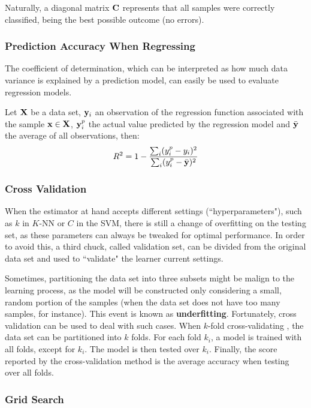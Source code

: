 Naturally, a diagonal matrix $\mathbf{C}$ represents that all samples were correctly classified, being the best possible outcome (no errors).

\subsubsection{Prediction Accuracy When Regressing}

The coefficient of determination, which can be interpreted as how much data variance is explained by a prediction model, can easily be used to evaluate regression models.

Let $\mathbf{X}$ be a data set, $\mathbf{y}_i$ an observation of the regression function associated with the sample $\mathbf{x} \in \mathbf{X}$, $\mathbf{y}_i^p$ the actual value predicted by the regression model and $\bar{\mathbf{y}}$ the average of all observations, then:
\begin{align*}
	R^2 = 1 - \frac{\sum_i (y_i^p - y_i)^2}{\sum_i (y_i^p - \bar{\mathbf{y}})^2}
\end{align*}

\subsubsection{Cross Validation}

When the estimator at hand accepts different settings (``hyperparameters"), such as $k$ in $K$-NN or $C$ in the SVM, there is still a change of overfitting on the testing set, as these parameters can always be tweaked for optimal performance. In order to avoid this, a third chuck, called validation set, can be divided from the original data set and used to ``validate" the learner current settings.

Sometimes, partitioning the data set into three subsets might be malign to the learning process, as the model will be constructed only considering a small, random portion of the samples (when the data set does not have too many samples, for instance). This event is known as \textbf{underfitting}. Fortunately, cross validation can be used to deal with such cases. When $k$-fold cross-validating \cite{crossvalid}, the data set can be partitioned into $k$ folds. For each fold $k_i$, a model is trained with all folds, except for $k_i$. The model is then tested over $k_i$. Finally, the score reported by the cross-validation method is the average accuracy when testing over all folds.

\subsubsection{Grid Search}


